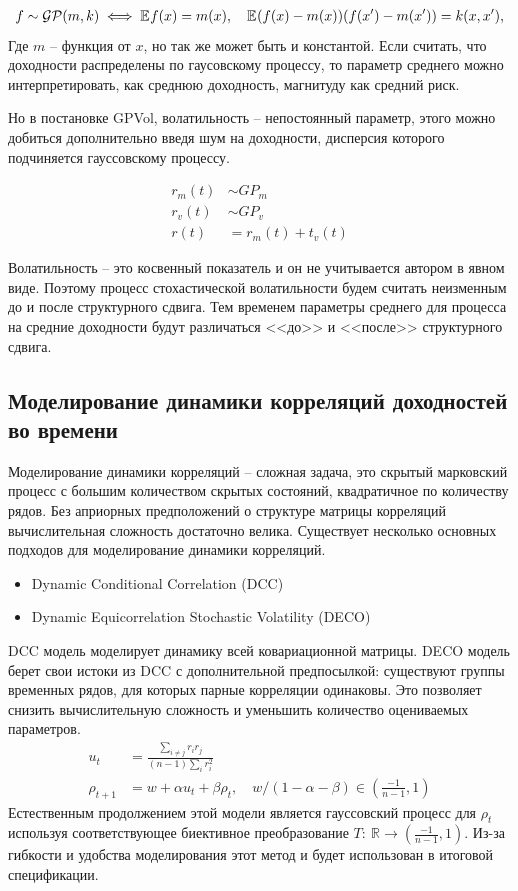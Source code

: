 \begin{align}
	f \sim \mathcal{GP}(m, k) \iff \mathbb{E}_{{}}{{f(x)}} = m(x),\quad \mathbb{E}_{{}}{{(f(x) - m(x))(f(x')-m(x'))}} = k(x, x'),
\end{align}
Где $m$ -- функция от $x$, но так же может быть и константой. Если считать, что доходности распределены по гаусовскому процессу, то параметр среднего можно интерпретировать, как среднюю доходность, магнитуду как средний риск. 

Но в постановке GPVol, волатильность -- непостоянный параметр, этого можно добиться дополнительно введя шум на доходности, дисперсия которого подчиняется гауссовскому процессу.

\begin{align}
	r_m(t) & \sim GP_m\\
	r_v(t) & \sim GP_v\\
	r(t) & = r_m(t) + t_v(t)
\end{align}

Волатильность -- это косвенный показатель и он не учитывается автором в явном виде. Поэтому процесс стохастической волатильности будем считать неизменным до и после структурного сдвига. Тем временем параметры среднего для процесса на средние доходности будут различаться <<до>> и <<после>> структурного сдвига.

\subsection{Моделирование динамики корреляций доходностей во времени}
Моделирование динамики корреляций -- сложная задача, это скрытый марковский процесс с большим количеством скрытых состояний, квадратичное по количеству рядов. Без априорных предположений о структуре матрицы корреляций вычислительная сложность достаточно велика. Существует несколько основных подходов для моделирование динамики корреляций.
\begin{itemize}
	\item Dynamic Conditional Correlation (DCC) \citep{engle2000}
	\item Dynamic Equicorrelation Stochastic Volatility (DECO) \citep{kurose2016}
\end{itemize}
DCC модель моделирует динамику всей ковариационной матрицы. DECO модель берет свои истоки из DCC с дополнительной предпосылкой: существуют группы временных рядов, для которых парные корреляции одинаковы. Это позволяет снизить вычислительную сложность и уменьшить количество оцениваемых параметров.
\begin{align}
u_t &= \frac{\sum_{i\neq j} r_i r_j}{(n-1) \sum_{i} r_i^2}\\
\rho_{t+1} &= w + \alpha u_t + \beta \rho_t, \quad w/(1-\alpha-\beta) \in \left(\tfrac{-1}{n-1}, 1\right)
\end{align}
Естественным продолжением этой модели является гауссовский процесс для $\rho_t$ используя соответствующее  биективное преобразование $T:\: \mathbb{R} \to \left(\tfrac{-1}{n-1}, 1\right)$. Из-за гибкости и удобства моделирования этот метод и будет использован в итоговой спецификации.

